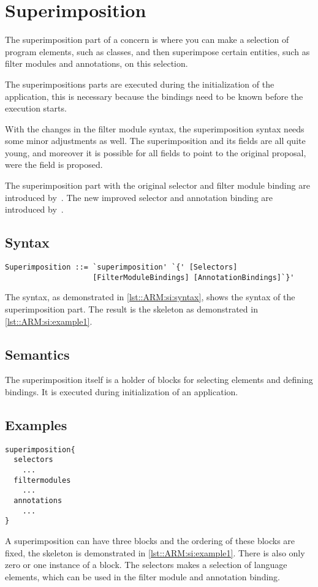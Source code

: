 \chapter{Superimposition} \label{chapter:superimposition}
The superimposition part of a concern is where you can make a selection of program elements, such as classes, and then superimpose certain entities, such as filter modules and annotations, on this selection.

The superimpositions parts are executed during the initialization of the application, this is necessary because the bindings need to be known before the execution starts.

With the changes in the filter module syntax, the superimposition syntax needs some minor adjustments as well.
The superimposition and its fields are all quite young, and moreover it is possible for
all fields to point to the original proposal, were the field is proposed.

The superimposition part with the original selector and
filter module binding are introduced by~\cite{salinas:ms01}. The new improved selector and
annotation binding are introduced by~\cite{Havinga2005}.

\section*{Syntax}
\begin{lstlisting}[caption = {Superimposition syntax}, label = lst::ARM:si:syntax,
style = listing, language = ebnf, float = tpb]
Superimposition ::= `superimposition' `{' [Selectors] 
                    [FilterModuleBindings] [AnnotationBindings]`}'
\end{lstlisting}
The syntax, as demonstrated in \autoref{lst::ARM:si:syntax}, shows the syntax of the superimposition part. The result is the 
skeleton as demonstrated in \autoref{lst::ARM:si:example1}.

\section*{Semantics}
The superimposition itself is a holder of blocks for selecting elements and defining bindings. It is executed
during initialization of an application.

\section*{Examples}
\begin{lstlisting}[caption={The superimposition skeleton}, label = lst::ARM:si:example1,
style=listing, language =ComposeStar, float = tpb]
superimposition{
  selectors
    ...
  filtermodules
    ...
  annotations
    ...
}
\end{lstlisting}
A superimposition can have three blocks and the ordering of these blocks are fixed, the skeleton is demonstrated in \autoref{lst::ARM:si:example1}. There is also only zero or one instance of a block. The selectors makes a selection of language elements, which can be used in the filter module and annotation binding.

